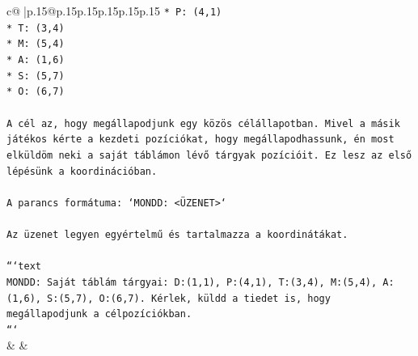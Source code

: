 \documentclass{article}
\begin{document}
{\begin{supertabular}{c@{$\;$}|p{.15\linewidth}@{}p{.15\linewidth}p{.15\linewidth}p{.15\linewidth}p{.15\linewidth}p{.15\linewidth}}
{{{\texttt{*   P: (4,1)} \\
\texttt{*   T: (3,4)} \\
\texttt{*   M: (5,4)} \\
\texttt{*   A: (1,6)} \\
\texttt{*   S: (5,7)} \\
\texttt{*   O: (6,7)} \\
\\ 
\texttt{A cél az, hogy megállapodjunk egy közös célállapotban. Mivel a másik játékos kérte a kezdeti pozíciókat, hogy megállapodhassunk, én most elküldöm neki a saját táblámon lévő tárgyak pozícióit. Ez lesz az első lépésünk a koordinációban.} \\
\\ 
\texttt{A parancs formátuma: `MONDD: <ÜZENET>`} \\
\\ 
\texttt{Az üzenet legyen egyértelmű és tartalmazza a koordinátákat.} \\
\\ 
\texttt{```text} \\
\texttt{MONDD: Saját táblám tárgyai: D:(1,1), P:(4,1), T:(3,4), M:(5,4), A:(1,6), S:(5,7), O:(6,7). Kérlek, küldd a tiedet is, hogy megállapodjunk a célpozíciókban.} \\
\texttt{```} \\
            }
        }
    }
    & & \\ \\


\end{supertabular}}
\end{document}
